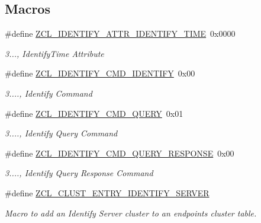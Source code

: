 \subsection*{Macros}
\begin{DoxyCompactItemize}
\item 
\mbox{\label{group__zcl__identify_ga7df877a02f273adc190aa24ad0aff4c9}} 
\#define \hyperlink{group__zcl__identify_ga7df877a02f273adc190aa24ad0aff4c9}{Z\+C\+L\+\_\+\+I\+D\+E\+N\+T\+I\+F\+Y\+\_\+\+A\+T\+T\+R\+\_\+\+I\+D\+E\+N\+T\+I\+F\+Y\+\_\+\+T\+I\+ME}~0x0000
\begin{DoxyCompactList}\small\item\em 3..., Identify\+Time Attribute \end{DoxyCompactList}\item 
\mbox{\label{group__zcl__identify_ga40368a52613d3ef210919d39a8e5d046}} 
\#define \hyperlink{group__zcl__identify_ga40368a52613d3ef210919d39a8e5d046}{Z\+C\+L\+\_\+\+I\+D\+E\+N\+T\+I\+F\+Y\+\_\+\+C\+M\+D\+\_\+\+I\+D\+E\+N\+T\+I\+FY}~0x00
\begin{DoxyCompactList}\small\item\em 3...., Identify Command \end{DoxyCompactList}\item 
\mbox{\label{group__zcl__identify_ga47774d9c6e213ee27738493dcf6e3f23}} 
\#define \hyperlink{group__zcl__identify_ga47774d9c6e213ee27738493dcf6e3f23}{Z\+C\+L\+\_\+\+I\+D\+E\+N\+T\+I\+F\+Y\+\_\+\+C\+M\+D\+\_\+\+Q\+U\+E\+RY}~0x01
\begin{DoxyCompactList}\small\item\em 3...., Identify Query Command \end{DoxyCompactList}\item 
\mbox{\label{group__zcl__identify_ga19fdbf2dca0a6d6fc36021c51d31214c}} 
\#define \hyperlink{group__zcl__identify_ga19fdbf2dca0a6d6fc36021c51d31214c}{Z\+C\+L\+\_\+\+I\+D\+E\+N\+T\+I\+F\+Y\+\_\+\+C\+M\+D\+\_\+\+Q\+U\+E\+R\+Y\+\_\+\+R\+E\+S\+P\+O\+N\+SE}~0x00
\begin{DoxyCompactList}\small\item\em 3...., Identify Query Response Command \end{DoxyCompactList}\item 
\#define \hyperlink{group__zcl__identify_gaeae5b3a460629b095247d160235ec586}{Z\+C\+L\+\_\+\+C\+L\+U\+S\+T\+\_\+\+E\+N\+T\+R\+Y\+\_\+\+I\+D\+E\+N\+T\+I\+F\+Y\+\_\+\+S\+E\+R\+V\+ER}
\begin{DoxyCompactList}\small\item\em Macro to add an Identify Server cluster to an endpoint\textquotesingle{}s cluster table. \end{DoxyCompactList}\end{DoxyCompactItemize}
